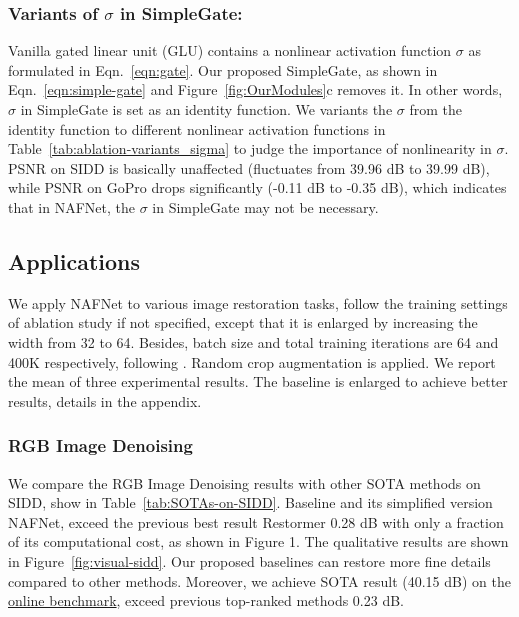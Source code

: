 \documentclass[runningheads]{llncs}
\begin{document}
\subsubsection{Variants of $\sigma$ in SimpleGate:} Vanilla gated linear unit (GLU) contains a nonlinear activation function $\sigma$ as formulated in Eqn.~\ref{eqn:gate}. Our proposed SimpleGate, as shown in Eqn.~\ref{eqn:simple-gate} and Figure~\ref{fig:OurModules}c removes it. In other words, $\sigma$ in SimpleGate is set as an identity function. We variants the $\sigma$ from the identity function to different nonlinear activation functions in Table~\ref{tab:ablation-variants_sigma} to judge the importance of nonlinearity in $\sigma$. PSNR on SIDD is basically unaffected (fluctuates from 39.96 dB to 39.99 dB), while PSNR on GoPro drops significantly (-0.11 dB to -0.35 dB), which indicates that in NAFNet, the $\sigma$ in SimpleGate may not be necessary.
\subsection{Applications}
We apply NAFNet to various image restoration tasks, follow the training settings of ablation study if not specified, except that it is enlarged by increasing the width from 32 to 64. Besides, batch size and total training iterations are 64 and 400K respectively, following \cite{chen2021hinet}. Random crop augmentation is applied.  We report the mean of three experimental results. The baseline is enlarged to achieve better results, details in the appendix.
\subsubsection{RGB Image Denoising} We compare the RGB Image Denoising results with other SOTA methods on SIDD, show in Table~\ref{tab:SOTAs-on-SIDD}. Baseline and its simplified version NAFNet, exceed the previous best result Restormer 0.28 dB with only a fraction of its computational cost, as shown in Figure 1. The qualitative results are shown in Figure~\ref{fig:visual-sidd}. Our proposed baselines can restore more fine details compared to other methods. Moreover, we achieve SOTA result (40.15 dB) on the \href{https://www.eecs.yorku.ca/~kamel/sidd/benchmark.php}{online benchmark}, exceed previous top-ranked methods 0.23 dB.
\end{document}
